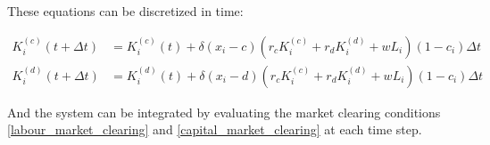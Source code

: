 These equations can be discretized in time:

\begin{align}
	K_i^{(c)}(t + \Delta t) &= K_{i}^{(c)}(t) + \delta(x_i-c)(r_c K_i^{(c)} + r_d K_i^{(d)} + wL_i)(1 -c_i)\Delta t \\
	K_i^{(d)}(t + \Delta t) &= K_{i}^{(d)}(t) + \delta(x_i-d)(r_c K_i^{(c)} + r_d K_i^{(d)} + wL_i)(1 -c_i)\Delta t
	\label{household_capital_dynamics_discretized}
\end{align}

And the system can be integrated by evaluating the market clearing conditions \eqref{labour_market_clearing} and \eqref{capital_market_clearing} at each time step.

{}
    
